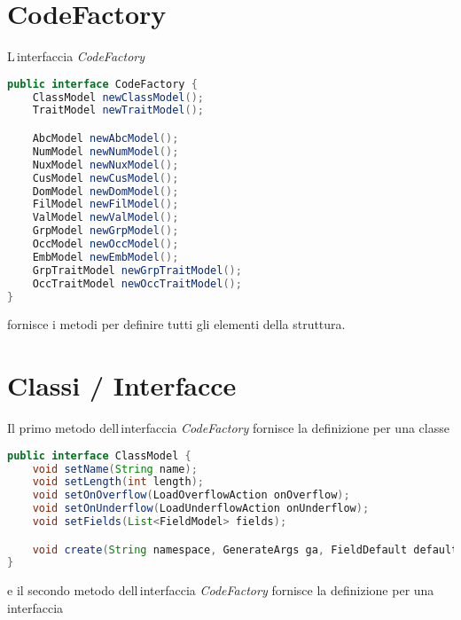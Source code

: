 \documentclass[a4paper,10pt]{report}
\begin{document}
\section{CodeFactory}
L\,interfaccia \textsl{CodeFactory}

\begin{lstlisting}[language=java, caption=interfaccia CodeFactory, 
label=code:CodeFactory]
public interface CodeFactory {
    ClassModel newClassModel();
    TraitModel newTraitModel();

    AbcModel newAbcModel();
    NumModel newNumModel();
    NuxModel newNuxModel();
    CusModel newCusModel();
    DomModel newDomModel();
    FilModel newFilModel();
    ValModel newValModel();
    GrpModel newGrpModel();
    OccModel newOccModel();
    EmbModel newEmbModel();
    GrpTraitModel newGrpTraitModel();
    OccTraitModel newOccTraitModel();
}
\end{lstlisting}
fornisce i metodi per definire tutti gli elementi della struttura.

\section{Classi / Interfacce}
Il primo metodo dell\,interfaccia \textsl{CodeFactory} fornisce la definizione 
per una classe

\begin{lstlisting}[language=java, caption=interfaccia ClassModel, 
label=code:ClassModel]
public interface ClassModel {
    void setName(String name);
    void setLength(int length);
    void setOnOverflow(LoadOverflowAction onOverflow);
    void setOnUnderflow(LoadUnderflowAction onUnderflow);
    void setFields(List<FieldModel> fields);

    void create(String namespace, GenerateArgs ga, FieldDefault defaults);
}
\end{lstlisting}

\noindent e il secondo metodo dell\,interfaccia \textsl{CodeFactory} fornisce la 
definizione per una interfaccia
\end{document}
